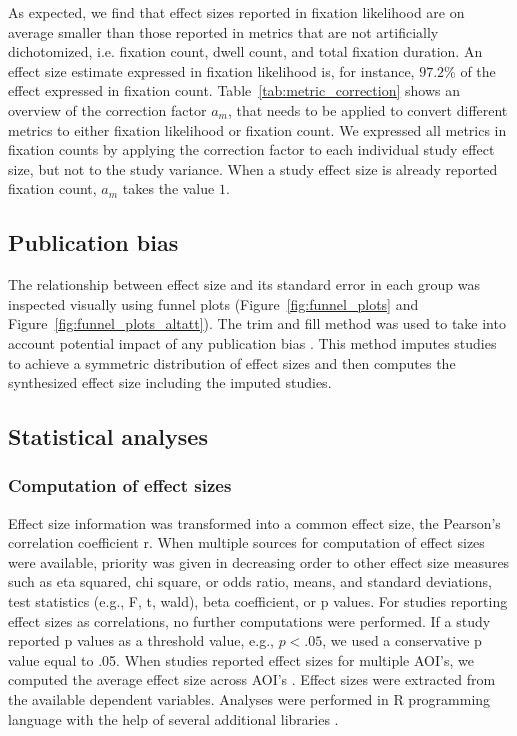 \documentclass[english,natbib,man,floatsintext]{apa6}
\begin{document}
As expected, we find that effect sizes reported in fixation likelihood are on average smaller than those reported in metrics that are not artificially dichotomized, i.e. fixation count, dwell count, and total fixation duration. An effect size estimate expressed in fixation likelihood is, for instance, $97.2\%$ of the effect expressed in fixation count. Table~\ref{tab:metric_correction} shows an overview of the correction factor $a_m$, that needs to be applied to convert different metrics to either fixation likelihood or fixation count. We expressed all metrics in fixation counts by applying the correction factor to each individual study effect size, but not to the study variance. When a study effect size is already reported fixation count, $a_m$ takes the value $1$.  


\subsection{Publication bias}

The relationship between effect size and its standard error in each group was inspected visually using funnel plots (Figure~\ref{fig:funnel_plots} and Figure~\ref{fig:funnel_plots_altatt}). The trim and fill method was used to take into account potential impact of any publication bias \citep{duval2000trim}. This method imputes studies to achieve a symmetric distribution of effect sizes and then computes the synthesized effect size including the imputed studies.


\subsection{Statistical analyses}

\subsubsection{Computation of effect sizes}

Effect size information was transformed into a common effect size, the Pearson’s correlation coefficient r. When multiple sources for computation of effect sizes were available, priority was given in decreasing order to other effect size measures such as eta squared, chi square, or odds ratio, means, and standard deviations, test statistics (e.g., F, t, wald), beta coefficient, or p values. For studies reporting effect sizes as correlations, no further computations were performed. If a study reported p values as a threshold value, e.g., $p < .05$, we used a conservative p value equal to .05. When studies reported effect sizes for multiple AOI's, we computed the average effect size across AOI's \citep[for a similar approach, see][]{chita2016attention}. Effect sizes were extracted from the available dependent variables. Analyses were performed in R programming language with the help of several additional libraries \citep{R2020,del2012a,datatable,ggplot2,metafor}.
\end{document}
